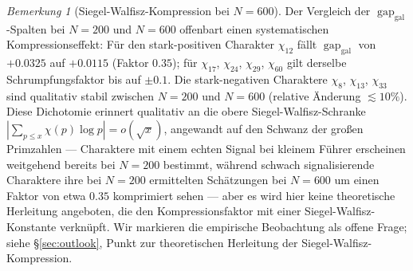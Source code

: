 \documentclass[a4paper,10pt,twocolumn]{article}
\theoremstyle{definition}
\theoremstyle{remark}
\newtheorem{remark}[theorem]{Bemerkung}
\newcommand{\gap}{\operatorname{gap}}
\newcommand{\chifn}{\chi}
\begin{document}
\begin{remark}[Siegel-Walfisz-Kompression bei $N=600$]
\label{rem:sw-compression}
Der Vergleich der $\gap_{\mathrm{gal}}$-Spalten bei $N=200$ und $N=600$
offenbart einen systematischen Kompressionseffekt: Für den stark-positiven
Charakter $\chifn_{12}$ fällt $\gap_{\mathrm{gal}}$ von
$+0.0325$ auf $+0.0115$ (Faktor $0.35$); für $\chifn_{17}$,
$\chifn_{24}$, $\chifn_{29}$, $\chifn_{60}$ gilt derselbe
Schrumpfungsfaktor bis auf $\pm 0.1$. Die stark-negativen
Charaktere $\chifn_8$, $\chifn_{13}$, $\chifn_{33}$ sind
qualitativ stabil zwischen $N=200$ und $N=600$ (relative Änderung
$\lesssim 10\%$). Diese Dichotomie erinnert qualitativ an die obere
Siegel-Walfisz-Schranke
$|\sum_{p\leq x}\chifn(p)\log p|=o(\sqrt{x})$, angewandt auf den
Schwanz der großen Primzahlen --- Charaktere mit einem echten
Signal bei kleinem Führer erscheinen weitgehend bereits bei $N=200$ bestimmt,
während schwach signalisierende Charaktere ihre bei $N=200$ ermittelten
Schätzungen bei $N=600$ um einen Faktor von etwa $0.35$ komprimiert sehen
--- aber es wird hier keine theoretische Herleitung angeboten, die den
Kompressionsfaktor mit einer Siegel-Walfisz-Konstante verknüpft. Wir
markieren die empirische Beobachtung als offene Frage; siehe
\S\ref{sec:outlook}, Punkt zur theoretischen Herleitung der
Siegel-Walfisz-Kompression.
\end{remark}
\end{document}
